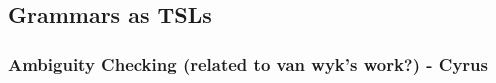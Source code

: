 \subsection{Grammars as TSLs}
\subsubsection{Ambiguity Checking (related to van wyk's work?) - Cyrus}


%
%
